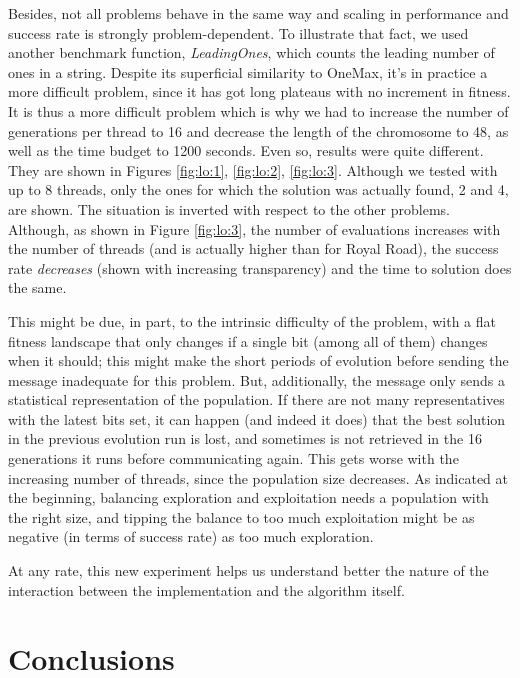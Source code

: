 \documentclass[runningheads]{llncs}\usepackage[]{graphicx}\usepackage[]{color}
\begin{document}
Besides, not all problems behave in the same way and scaling in
performance and success rate is strongly problem-dependent. To
illustrate that fact, we used another benchmark function, {\em
  LeadingOnes}, which counts the leading number of ones in a
string. Despite its superficial similarity to OneMax, it's in practice
a more difficult problem, since it has got long plateaus with no
increment in fitness. It is thus a more difficult problem which is why
we had to increase the number of generations per thread to 16 and
decrease the length of the chromosome to 48, as well as the time
budget to 1200 seconds. Even so, results were quite different. They
are shown in Figures \ref{fig:lo:1}, \ref{fig:lo:2},
\ref{fig:lo:3}. Although we tested with up to 8 threads, only the ones
for which the solution was actually found, 2 and 4, are shown. The
situation is inverted with respect to the other problems. Although, as
shown in Figure \ref{fig:lo:3}, the number of evaluations increases
with the number of threads (and is actually higher than for Royal
Road), the success rate {\em decreases} (shown with increasing
transparency) and the time to solution does the same.

This might be due, in part, to the intrinsic difficulty of the
problem, with a flat fitness landscape that only changes if a single
bit (among all of them) changes when it should; this might make the
short periods of evolution before sending the message inadequate for
this problem. But, additionally, the message only sends a statistical
representation of the population. If there are not many
representatives with the latest bits set, it can happen (and indeed it
does) that the best solution in the previous evolution run is lost,
and sometimes is not retrieved in the 16 generations it runs before
communicating again. This gets worse with the increasing number of
threads, since the population size decreases. As indicated at the
beginning, balancing exploration and exploitation needs a population
with the right size, and tipping the balance to too much exploitation
might be as negative (in terms of success rate) as too much exploration.

At any rate, this new experiment helps us understand better the nature
of the interaction between the implementation and the algorithm
itself. 

\section{Conclusions}
\label{sec:conclusions}
\end{document}
